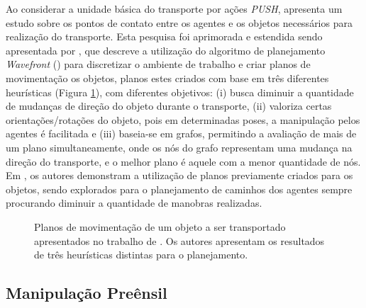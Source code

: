 Ao considerar a unidade básica do transporte por ações \emph{PUSH}, \cite{Parra-Gonzalez2008} apresenta um estudo sobre os pontos de contato entre os agentes e os objetos necessários para realização do transporte. Esta pesquisa foi aprimorada e estendida sendo apresentada por \cite{Parra-Gonzalez2011}, que descreve a utilização do algoritmo de planejamento \emph{Wavefront} (\cite{LaValle2006}) para discretizar o ambiente de trabalho e criar planos de movimentação os objetos, planos estes criados com base em três diferentes heurísticas (Figura \ref{fig:parra_object}), com diferentes objetivos: (i) busca diminuir a quantidade de mudanças de direção do objeto durante o transporte, (ii) valoriza certas orientações/rotações do objeto, pois em determinadas poses, a manipulação pelos agentes é facilitada e (iii) baseia-se em grafos, permitindo a avaliação de mais de um plano simultaneamente, onde os nós do grafo representam uma mudança na direção do transporte, e o melhor plano é aquele com a menor quantidade de nós.
Em \cite{Parra-Gonzalez2012}, os autores demonstram a utilização de planos previamente criados para os objetos, sendo explorados para o planejamento de caminhos dos agentes sempre procurando diminuir a quantidade de manobras realizadas.


\begin{figure}[h]
  \centering
  \setlength{\fboxsep}{0pt}
  \caption[Planos de movimentação de um objeto a ser transportado]{Planos de movimentação de um objeto a ser transportado apresentados no trabalho de \cite{Parra-Gonzalez2011}. Os autores apresentam os resultados de três heurísticas distintas para o planejamento.}
  \label{fig:parra_object}
\end{figure}

\subsection{Manipulação Preênsil} %
\label{sub:manipula_o_pre_nsil}


